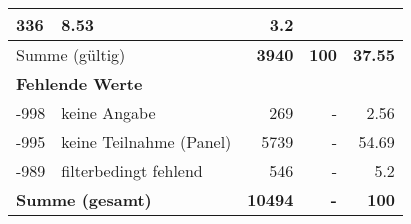 \begin{longtable}{lXrrr}
       \num{336} &
       \num[round-mode=places,round-precision=2]{8.53} &
         \num[round-mode=places,round-precision=2]{3.2} \\
     \midrule
     \multicolumn{2}{l}{Summe (gültig)} &
       \textbf{\num{3940}} &
     \textbf{\num{100}} &
       \textbf{\num[round-mode=places,round-precision=2]{37.55}} \\
     \multicolumn{5}{l}{\textbf{Fehlende Werte}}\\
       -998 &
       keine Angabe &
         \num{269} &
        - &
         \num[round-mode=places,round-precision=2]{2.56} \\
       -995 &
       keine Teilnahme (Panel) &
         \num{5739} &
        - &
         \num[round-mode=places,round-precision=2]{54.69} \\
       -989 &
       filterbedingt fehlend &
         \num{546} &
        - &
         \num[round-mode=places,round-precision=2]{5.2} \\
     \midrule
     \multicolumn{2}{l}{\textbf{Summe (gesamt)}} &
          \textbf{\num{10494}} &
        \textbf{-} &
        \textbf{\num{100}} \\
     \bottomrule
     \end{longtable}
     
